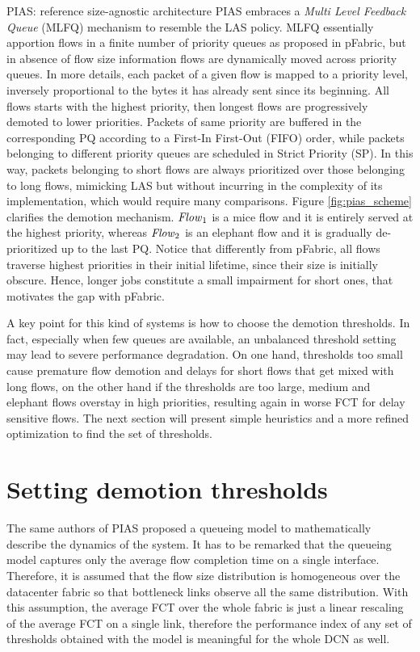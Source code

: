 \begin{subsection}{PIAS: reference size-agnostic architecture}
	PIAS embraces a \emph{Multi Level Feedback Queue} (MLFQ) mechanism to resemble the LAS policy. MLFQ essentially apportion flows in a finite number of priority queues as proposed in pFabric, but in absence of flow size information flows are dynamically moved across priority queues. In more details, each packet of a given flow is mapped to a priority level, inversely proportional to the bytes it has already sent since its beginning. All flows starts with the highest priority, then longest flows are progressively demoted to lower priorities. Packets of same priority are buffered in the corresponding PQ according to a First-In First-Out (FIFO) order, while packets belonging to different priority queues are scheduled in Strict Priority (SP). In this way, packets belonging to short flows are always prioritized over those belonging to long flows, mimicking LAS but without incurring in the complexity of its implementation, which would require many comparisons. Figure \ref{fig:pias_scheme} clarifies the demotion mechanism. $\text{\emph{Flow}}_1$ is a mice flow and it is entirely served at the highest priority, whereas $\text{\emph{Flow}}_2$ is an elephant flow and it is gradually de-prioritized up to the last PQ. Notice that differently from pFabric, all flows traverse highest priorities in their initial lifetime, since their size is initially obscure. Hence, longer jobs constitute a small impairment for short ones, that motivates the gap with pFabric.

A key point for this kind of systems is how to choose the demotion thresholds. In fact, especially when few queues are available, an unbalanced threshold setting may lead to severe performance degradation. On one hand, thresholds too small cause premature flow demotion and delays for short flows that get mixed with long flows, on the other hand if the thresholds are too large, medium and elephant flows overstay in high priorities, resulting again in worse FCT for delay sensitive flows. The next section will present simple heuristics and a more refined optimization to find the set of thresholds.
\end{subsection}

\section{Setting demotion thresholds}
The same authors of PIAS proposed a queueing model to mathematically describe the dynamics of the system. It has to be remarked that the queueing model captures only the average flow completion time on a single interface. Therefore, it is assumed that the flow size distribution is homogeneous over the datacenter fabric so that bottleneck links observe all the same distribution. With this assumption, the average FCT over the whole fabric is just a linear rescaling of the average FCT on a single link, therefore the performance index of any set of thresholds obtained with the model is meaningful for the whole DCN as well. 

